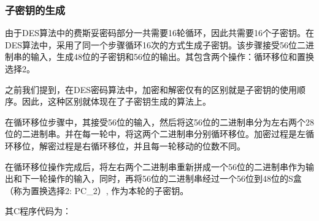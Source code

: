 \subsubsection{子密钥的生成}
由于DES算法中的费斯妥密码部分一共需要16轮循环，因此共需要16个子密钥。在DES算法中，采用了同一个步骤循环16次的方式生成子密钥。该步骤接受56位二进制串的输入，生成48位的子密钥和56位的输出。其包含两个操作：循环移位和置换选择2。\par
之前我们提到，在DES密码算法中，加密和解密仅有的区别就是子密钥的使用顺序。因此，这种区别就体现在了子密钥生成的算法上。\par
在循环移位步骤中，其接受56位的输入，然后将这56位的二进制串分为左右两个28位的二进制串。并在每一轮中，将这两个二进制串分别循环移位。加密过程是左循环移位，解密过程是右循环移位，并且每一轮移动的位数不同。\par
在循环移位操作完成后，将左右两个二进制串重新拼成一个56位的二进制串作为输出和下一轮操作的输入，同时，再将56位的二进制串经过一个56位到48位的S盒（称为置换选择2: PC\_2）, 作为本轮的子密钥。\par
其C程序代码为：
